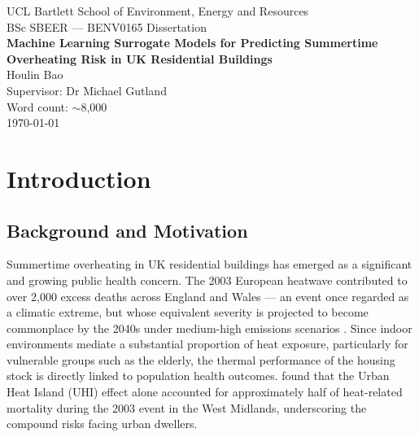 \documentclass[12pt,a4paper]{report}
\begin{document}
\begin{titlepage}
\centering
\vspace*{2cm}
{\Large UCL Bartlett School of Environment, Energy and Resources\\[0.5cm]}
{\large BSc SBEER --- BENV0165 Dissertation\\[2cm]}
{\LARGE\bfseries Machine Learning Surrogate Models for Predicting Summertime Overheating Risk in UK Residential Buildings\\[2cm]}
{\large Houlin Bao\\[0.5cm]}
Supervisor: Dr Michael Gutland\\[1cm]
Word count: $\sim$8{,}000\\[2cm]
\today
\end{titlepage}

\begin{abstract}
\noindent
\end{abstract}

\tableofcontents
\listoffigures
\listoftables

\chapter{Introduction}
\label{ch:introduction}

\section{Background and Motivation}
\label{sec:background}

Summertime overheating in UK residential buildings has emerged as a significant and growing public health concern. The 2003 European heatwave contributed to over 2{,}000 excess deaths across England and Wales \citep{Johnson2005} --- an event once regarded as a climatic extreme, but whose equivalent severity is projected to become commonplace by the 2040s under medium-high emissions scenarios \citep{Murphy2009}. Since indoor environments mediate a substantial proportion of heat exposure, particularly for vulnerable groups such as the elderly, the thermal performance of the housing stock is directly linked to population health outcomes. \citet{Heaviside2016} found that the Urban Heat Island (UHI) effect alone accounted for approximately half of heat-related mortality during the 2003 event in the West Midlands, underscoring the compound risks facing urban dwellers.
\end{document}

